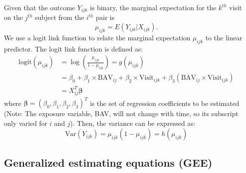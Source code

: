 \documentclass[
]{aft}
\begin{document}
Given that the outcome \(Y_{ijk}\) is binary, the marginal expectation
for the \(k^{th}\) visit on the \(j^{th}\) subject from the \(i^{th}\)
pair is \begin{equation}
\mu_{ijk} = E(Y_{ijk}|X_{ijk}). \label{eq:marginExpecatiton}
\end{equation} We use a logit link function to relate the marginal
expectation \(\mu_{ijk}\) to the linear predictor. The logit link
function is defined as: \[
\begin{aligned}
\text{logit}(\mu_{ijk}) &= \log(\frac{\mu_{ijk}}{1-\mu_{ijk}})= g(\mu_{ijk}) \\
&= \beta_0 + \beta_1 \times \text{BAV}_{ij} + \beta_2 \times \text{Visit}_{ijk}+\beta_3 (\text{BAV}_{ij}\times \text{Visit}_{ijk})\\
& = X_{ij}^T\boldsymbol{\beta}
\end{aligned}
\] where \(\boldsymbol{\beta} = (\beta_0, \beta_1, \beta_2, \beta_3)^T\)
is the set of regression coefficients to be estimated (Note: The
exposure variable, BAV, will not change with time, so its subscript only
varied for \(i\) and \(j\)). Then, the variance can be expressed as:
\begin{equation}
\text{Var}(Y_{ijk}) = \mu_{ijk}(1-\mu_{ijk}) = h(\mu_{ijk}) \label{eq:marginVariance}
\end{equation}

\subsection{Generalized estimating equations
(GEE)}\label{generalized-estimating-equations-gee}
\end{document}
